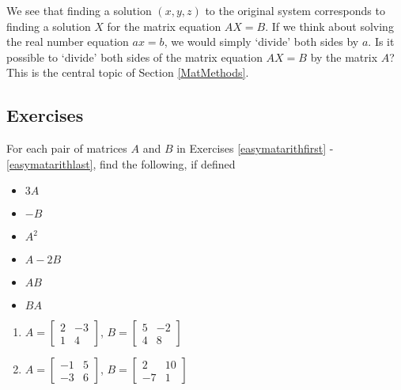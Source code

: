 We see that finding a solution $(x,y,z)$ to the original system corresponds to finding a solution $X$ for the matrix equation $AX = B$.   If we think about solving the real number equation $ax = b$, we would simply `divide' both sides by $a$. Is it possible to `divide' both sides of the matrix equation $AX = B$ by the matrix $A$?    This is the central topic of Section \ref{MatMethods}. 

\newpage

\subsection{Exercises}

For each pair of matrices $A$ and $B$ in  Exercises \ref{easymatarithfirst} - \ref{easymatarithlast}, find the following, if defined

\begin{multicols}{3}
\begin{itemize}
\item  $3A$

\item $-B$

\item $A^2$

\end{itemize}
\end{multicols}


\begin{multicols}{3}
\begin{itemize}
\item  $A-2B$

\item $AB$

\item $BA$

\end{itemize}
\end{multicols}

\begin{multicols}{2} 
\begin{enumerate}

\item  $A = \left[ \begin{array}{rr} 2 & -3 \\ 1 & 4 \end{array} \right]$, $B=\left[ \begin{array}{rr} 5 & -2 \\ 4 & 8 \end{array} \right]$ \label{easymatarithfirst}

\item  $A = \left[ \begin{array}{rr} -1 & 5 \\ -3 & 6 \end{array} \right]$, $B=\left[ \begin{array}{rr} 2 & 10 \\ -7 & 1 \end{array} \right]$

\setcounter{HW}{\value{enumi}}
\end{enumerate}
\end{multicols}

